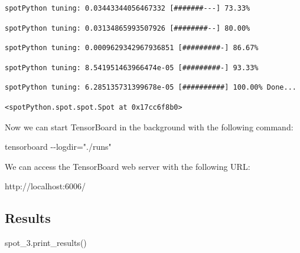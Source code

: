 \documentclass[
  letterpaper,
  DIV=11,
  numbers=noendperiod]{scrreprt}
\newenvironment{Shaded}{\begin{snugshade}}{\end{snugshade}}
\newcommand{\NormalTok}[1]{\textcolor[rgb]{0.00,0.23,0.31}{#1}}
\begin{document}
\begin{verbatim}
spotPython tuning: 0.03443344056467332 [#######---] 73.33% 
\end{verbatim}

\begin{verbatim}
spotPython tuning: 0.03134865993507926 [########--] 80.00% 
\end{verbatim}

\begin{verbatim}
spotPython tuning: 0.0009629342967936851 [#########-] 86.67% 
\end{verbatim}

\begin{verbatim}
spotPython tuning: 8.541951463966474e-05 [#########-] 93.33% 
\end{verbatim}

\begin{verbatim}
spotPython tuning: 6.285135731399678e-05 [##########] 100.00% Done...
\end{verbatim}

\begin{verbatim}
<spotPython.spot.spot.Spot at 0x17cc6f8b0>
\end{verbatim}

Now we can start TensorBoard in the background with the following
command:

\begin{Shaded}
\begin{Highlighting}[]
\NormalTok{tensorboard {-}{-}logdir="./runs"}
\end{Highlighting}
\end{Shaded}

We can access the TensorBoard web server with the following URL:

\begin{Shaded}
\begin{Highlighting}[]
\NormalTok{http://localhost:6006/}
\end{Highlighting}
\end{Shaded}

\hypertarget{results}{%
\subsection{Results}\label{results}}

\begin{Shaded}
\begin{Highlighting}[]
\NormalTok{spot\_3.print\_results()}
\end{Highlighting}
\end{Shaded}
\end{document}
